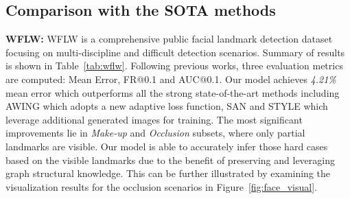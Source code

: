\documentclass[runningheads]{llncs}
\begin{document}
\begin{table}[t!]
{\centering
        \caption{Evaluations on the hand X-ray and pelvic X-ray images.}
  \label{tab:hand_pelvic}
}
\end{table}


\subsection{Comparison with the SOTA methods}
\noindent\textbf{WFLW:} WFLW is a comprehensive public facial landmark detection dataset focusing on multi-discipline and difficult detection scenarios. Summary of results is shown in Table~\ref{tab:wflw}. Following previous works, three evaluation metrics are computed: Mean Error, FR@0.1 and AUC@0.1. Our model achieves \textit{4.21\%} mean error which outperforms all the strong state-of-the-art methods including AWING \cite{wang2019adaptive} which adopts a new adaptive loss function, SAN \cite{dong2018style} and STYLE \cite{qian2019aggregation} which leverage additional generated images for training. The most significant improvements lie in \textit{Make-up} and \textit{Occlusion} subsets, where only partial landmarks are visible. Our model is able to accurately infer those hard cases based on the visible landmarks due to the benefit of preserving and leveraging graph structural knowledge. This can be further illustrated by examining the visualization results for the occlusion scenarios in Figure~\ref{fig:face_visual}.
\end{document}
